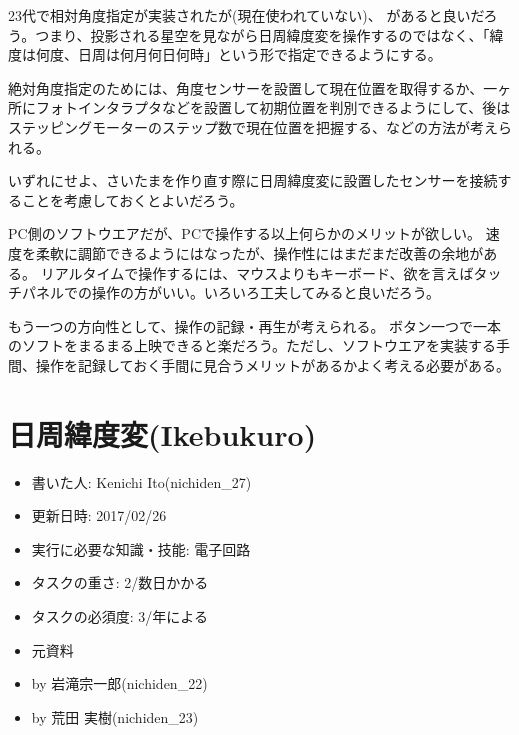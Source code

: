 \documentclass[letterpaper,10pt,dvipdfmx]{sphinxmanual}
\begin{document}
23代で相対角度指定が実装されたが(現在使われていない)、
があると良いだろう。つまり、投影される星空を見ながら日周緯度変を操作するのではなく、「緯度は何度、日周は何月何日何時」という形で指定できるようにする。

絶対角度指定のためには、角度センサーを設置して現在位置を取得するか、一ヶ所にフォトインタラプタなどを設置して初期位置を判別できるようにして、後はステッピングモーターのステップ数で現在位置を把握する、などの方法が考えられる。

いずれにせよ、さいたまを作り直す際に日周緯度変に設置したセンサーを接続することを考慮しておくとよいだろう。

PC側のソフトウエアだが、PCで操作する以上何らかのメリットが欲しい。
速度を柔軟に調節できるようにはなったが、操作性にはまだまだ改善の余地がある。
リアルタイムで操作するには、マウスよりもキーボード、欲を言えばタッチパネルでの操作の方がいい。いろいろ工夫してみると良いだろう。

もう一つの方向性として、操作の記録・再生が考えられる。
ボタン一つで一本のソフトをまるまる上映できると楽だろう。ただし、ソフトウエアを実装する手間、操作を記録しておく手間に見合うメリットがあるかよく考える必要がある。


\chapter{日周緯度変(Ikebukuro)}
\label{\detokenize{nissyu-idohen/ikebukuro:ikebukuro}}\label{\detokenize{nissyu-idohen/ikebukuro::doc}}\begin{itemize}
\item {} 
書いた人: Kenichi Ito(nichiden\_27)

\item {} 
更新日時: 2017/02/26

\item {} 
実行に必要な知識・技能: 電子回路

\item {} 
タスクの重さ: 2/数日かかる

\item {} 
タスクの必須度: 3/年による

\item {} 
元資料

\item {} 
 by 岩滝宗一郎(nichiden\_22)

\item {} 
 by 荒田 実樹(nichiden\_23)

\end{itemize}
\end{document}
